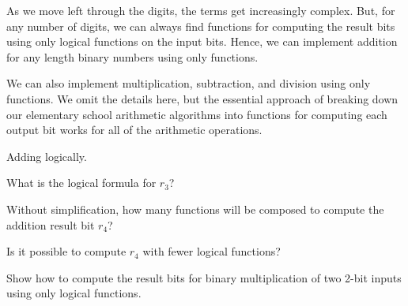 \begin{schemeregion}
As we move left through the digits, the terms get increasingly complex.  But, for any number of digits, we can always find functions for computing the result bits using only logical functions on the input bits.  Hence, we can implement addition for any length binary numbers using only  functions.


We can also implement multiplication, subtraction, and division using only  functions.  We omit the details here, but the essential approach of breaking down our elementary school arithmetic algorithms into functions for computing each output bit works for all of the arithmetic operations.

\beforeex
\begin{exercise}
Adding logically.
\begin{subexerciselist}
\item What is the logical formula for $r_3$?
\solution{\LATER{}}
\item Without simplification, how many functions will be composed to compute the addition result bit $r_4$?  
\solution{\LATER{}}
\item \goldstar Is it possible to compute $r_4$ with fewer logical functions?
\solution{\LATER{}}
\end{subexerciselist}
\end{exercise}
\afterex

\beforeex
\begin{exercise} \bluestar 
Show how to compute the result bits for binary multiplication of two 2-bit inputs using only logical functions.
\solution{\LATER{}}
\end{exercise}
\afterex


\end{schemeregion}
